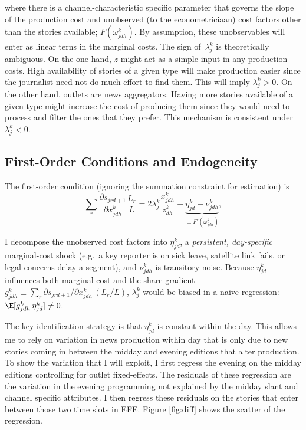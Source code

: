 \documentclass[12pt]{article}
\begin{document}
where there is a channel-characteristic specific parameter that governs the slope of the production cost and unobserved (to the econometriciaan) cost factors other than the stories available; $ F(\omega^k_{jdh})$. By assumption, these unobservables will enter as linear terns in the marginal costs. The sign of~$\lambda_j^k$
is theoretically ambiguous. On the one hand, $z$ might act as a simple input in any production costs. High availability of stories of a given type will make production easier since the journalist need not do much effort to find them. This will imply $ \lambda_j^k>0$. On the other hand, outlets are news aggregators. Having more stories available of a given type might increase the cost of producing them since they would need to process and filter the ones that they prefer. This mechanism is consistent under $ \lambda_j^k<0$.


\subsection*{First-Order Conditions and Endogeneity}

The first-order condition (ignoring the summation constraint for estimation) is
\begin{equation}\label{eq:focs}
	\sum_{r}\frac{\partial s_{jrd+1}}{\partial x_{jdh}^k}\frac{L_r}{L}=	2\lambda_j^k\frac{x_{jdh}^k}{z_{dh}^k} +\underbrace{	\eta_{jd}^k+\nu_{jdh}^k}_{\equiv F'(\omega_{jdh}^k)},
\end{equation}


I decompose the unobserved cost factors into 
$\eta_{jd}^k$, a \emph{persistent, day-specific} marginal-cost shock
(e.g.\ a key reporter is on sick leave, satellite link fails, or legal concerns delay a segment),
and $\nu_{jdh}^k$ is transitory noise. 
Because $\eta_{jd}^k$ influences both marginal cost and the share gradient
$g_{jdh}^k\equiv\sum_{r}\partial s_{jrd+1}/\partial x_{jdh}^k\,(L_r/L)$,
$\lambda_j^k$ would be biased in a naive regression: $\E[g_{jdh}^k\,\eta_{jd}^k]\neq0$.


The key identification strategy is that $\eta_{jd}^k$ is constant within the day. This allows me to rely on variation in news production within day that is only due to new stories coming in between the midday and evening editions that alter production.  To show the variation that I will exploit, I first regress the evening on the midday editions controlling for outlet fixed-effects. The residuals of these regression are the  variation in the evening programming not explained by the midday slant and channel specific attributes. I then regress these residuals on the stories that enter between those two time slots in EFE. Figure \ref{fig:diff} shows the scatter of the regression. 
\end{document}
